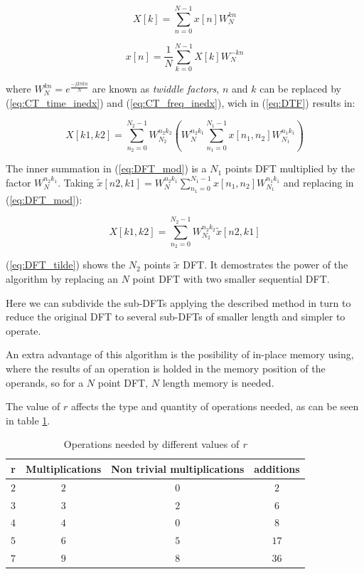 \documentclass[conference]{IEEEtran}
\begin{document}
\begin{equation}
X[k] = \sum_{n=0}^{N-1}x[n]W_N^{kn}
\label{eq:DTF}
\end{equation}

\begin{equation}
x[n] = \frac{1}{N}\sum_{k=0}^{N-1}X[k]W_N^{-kn}
\label{eq:iDTF}
\end{equation}

where $W_N^{kn}=e^{\frac{-j2\pi kn}{N}}$ are known as \textit{twiddle factors}, $n$ and $k$ can be replaced by (\ref{eq:CT_time_inedx})
and (\ref{eq:CT_freq_inedx}), wich in (\ref{eq:DTF}) results in:

\begin{equation}
X[k1,k2]=\sum_{n_2=0}^{N_2-1}
W_{N_2}^{n_2k_2}\left(W_{N}^{n_2k_1}\sum_{n_1=0}^{N_1-1}x[n_1,n_2]W_{N_1}^{n_1k_1}\right)
\label{eq:DFT_mod}
\end{equation}

The inner summation in (\ref{eq:DFT_mod}) is a $N_1$ points DFT multiplied by the factor $W_{N}^{n_2k_1}$. 
Taking $\tilde{x}[n2,k1]=W_{N}^{n_2k_1}\sum_{n_1=0}^{N_1-1}x[n_1,n_2]W_{N_1}^{n_1k_1}$
and replacing in (\ref{eq:DFT_mod}):

\begin{equation}
X[k1,k2]=\sum_{n_2=0}^{N_2-1}
W_{N_2}^{n_2k_2}\tilde{x}[n2,k1]
\label{eq:DFT_tilde}
\end{equation}

(\ref{eq:DFT_tilde}) shows the $N_2$ points $\tilde{x}$ DFT. It demostrates the power of the algorithm by replacing an $N$ point DFT
with two smaller sequential DFT. 

Here we can subdivide the sub-DFTs applying the described method in turn to reduce the original DFT to 
several sub-DFTs of smaller length and simpler to operate.

An extra advantage of this algorithm is the posibility of in-place memory using, where the results of an operation
is holded in the memory position of the operands, so for a $N$ point DFT, $N$ length memory is needed.

The value of $r$ affects the type and quantity of operations needed, as can
be seen in table \ref{table:fft_oper}.

\begin{table}[h]
\begin{tabular}{c c c c}
\textbf{r} & \textbf{Multiplications} & \textbf{Non trivial multiplications} &
\textbf{additions} \\ \hline 
$2$ & $2$ & $0$ & $2$ \\
$3$ & $3$ & $2$ & $6$ \\
$4$ & $4$ & $0$ & $8$ \\
$5$ & $6$ & $5$ & $17$ \\
$7$ & $9$ & $8$ & $36$ \\ \hline
\end{tabular}
\caption{Operations needed by different values of \textit{r}}
\label{table:fft_oper}
\end{table}
 
\end{document}
